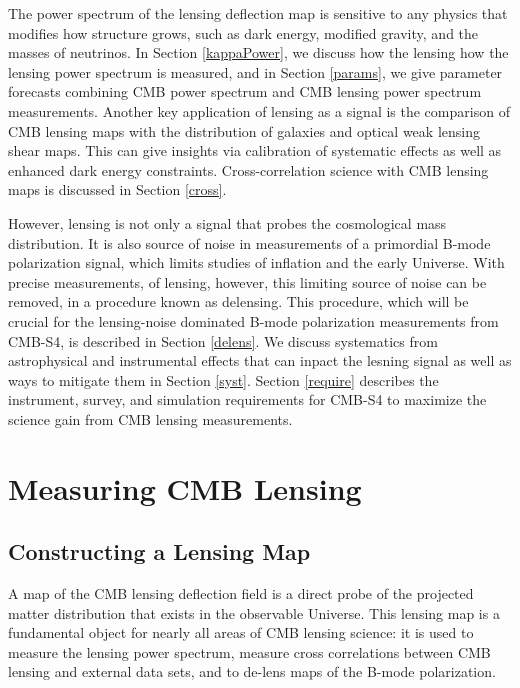 The power spectrum of the lensing deflection map is sensitive to any physics that modifies how structure grows, such as dark energy, modified gravity, and the masses of neutrinos.  In Section \ref{kappaPower}, we discuss how the lensing how the lensing power spectrum is measured, and in Section \ref{params}, we give parameter forecasts combining CMB power spectrum and CMB lensing power spectrum measurements.   Another key application of lensing as a signal is the comparison of CMB lensing maps with the distribution of galaxies and optical weak lensing shear maps.  This can give insights  via calibration of systematic effects as well as enhanced dark energy constraints. Cross-correlation science with CMB lensing maps is discussed in Section \ref{cross}.

However, lensing is not only a signal that probes the cosmological mass distribution. It is also source of noise in measurements of a primordial B-mode polarization signal, which limits studies of inflation and the early Universe. With precise measurements, of lensing, however, this limiting source of noise can be removed, in a procedure known as delensing. This procedure, which will be crucial for the lensing-noise dominated B-mode polarization measurements from CMB-S4, is described in Section \ref{delens}.  We discuss systematics from astrophysical and instrumental effects that can inpact the lesning signal as well as ways to mitigate them in Section \ref{syst}.  Section \ref{require} describes the instrument, survey, and simulation requirements for CMB-S4 to maximize the science gain from CMB lensing measurements.


\section{Measuring CMB Lensing}

\subsection{Constructing a Lensing Map}\label{kappaMap}

A map of the CMB lensing deflection field is a direct probe of the projected matter distribution that exists in the observable Universe. This lensing map is a fundamental object for nearly all areas of CMB lensing science: it is used to measure the lensing power spectrum, measure cross correlations between CMB lensing and external data sets, and to de-lens maps of the B-mode polarization.  

